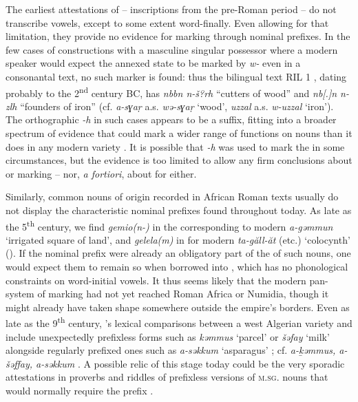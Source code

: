 \documentclass[output=paper,colorlinks,citecolor=brown]{langscibook}
\begin{document}
The earliest attestations of  --  inscriptions from the pre-Roman period -- do not transcribe vowels, except to some extent word-finally. Even allowing for that limitation, they provide no evidence for  marking through nominal prefixes. In the few cases of  constructions with a masculine singular possessor where a modern speaker would expect the annexed state to be marked by \emph{w-} even in a consonantal text, no such marker is found: thus the bilingual text RIL 1 \citep[1--2]{chabot1940}, dating probably to the 2\textsuperscript{nd} century BC, has \emph{nbbn n-š?rh} ``cutters of wood'' and \emph{nb[.]n n-zlh} ``founders of iron'' (cf.  \emph{a-sɣaṛ} a.s. \emph{wə-sɣaṛ} `wood', \emph{uzzal} a.s. \emph{w-uzzal} `iron'). The orthographic \emph{-h} in such cases appears to be a suffix, fitting into a broader spectrum of evidence that  could mark a wider range of functions on  nouns than it does in any modern  variety \citep{vanputten2017}. It is possible that \emph{-h} was used to mark the  in some circumstances, but the evidence is too limited to allow any firm conclusions about  or  marking -- nor, \emph{a fortiori}, about  for either.

{\sloppy Similarly, common nouns of  origin recorded in African Roman texts usually do not display the characteristic nominal prefixes found throughout  today. As late as the 5\textsuperscript{th} century, we find  \emph{gemio(n-)} in the  corresponding to modern \emph{a-gəmmun} `irrigated square of land', and \emph{gelela(m)} in  for modern \emph{ta-găll-ăt} (etc.) `colocynth' (\citealt{murciasanchez2011}). If the nominal prefix were already an obligatory part of the  of such nouns, one would expect them to remain so when borrowed into , which has no phonological constraints on word-initial vowels. It thus seems likely that the modern pan- system of  marking had not yet reached Roman Africa or Numidia, though it might already have taken shape somewhere outside the empire's borders. Even as late as the 9\textsuperscript{th} century, 's lexical comparisons between a west Algerian  variety and  include unexpectedly prefixless forms such as \emph{kəmmus} `parcel' or \emph{šəfay} `milk' alongside regularly prefixed ones such as \emph{a-səkkum} `asparagus' \citep{cohen1972}; cf.  \emph{a-ḵəmmus, a-šəffay, a-səkkum} \citep{abarrou2023}. A possible relic of this stage today could be the very sporadic attestations in  proverbs and riddles of prefixless versions of \textsc{m.sg.} nouns that would normally require the prefix \citep[58]{brugnatelli2006}.\par}
\end{document}
